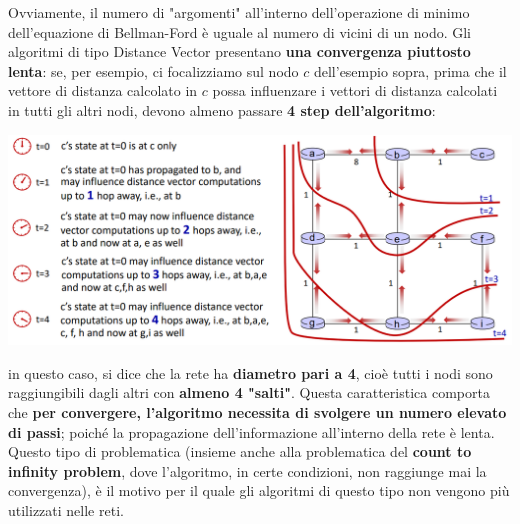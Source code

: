 \documentclass[12pt]{article}
\begin{document}
Ovviamente, il numero di "argomenti" all'interno dell'operazione di minimo dell'equazione di Bellman-Ford è uguale al numero di vicini di un nodo.
Gli algoritmi di tipo Distance Vector presentano \textbf{una convergenza piuttosto lenta}: se, per esempio, ci focalizziamo sul nodo $c$ dell'esempio sopra,
prima che il vettore di distanza calcolato in $c$ possa influenzare i vettori di distanza calcolati in tutti gli altri nodi, devono almeno passare \textbf{4 step dell'algoritmo}:
\begin{center}
    \includegraphics[width =1\linewidth]{Images/106.png}
\end{center}
in questo caso, si dice che la rete ha \textbf{diametro pari a 4}, cioè tutti i nodi sono raggiungibili dagli altri con \textbf{almeno 4 "salti"}.
Questa caratteristica comporta che \textbf{per convergere, l'algoritmo necessita di svolgere un numero elevato di passi}; poiché la propagazione dell'informazione all'interno della rete è lenta.
Questo tipo di problematica (insieme anche alla problematica del \textbf{count to infinity problem}, dove l'algoritmo, in certe condizioni, non raggiunge mai la convergenza), è il motivo per il quale
gli algoritmi di questo tipo non vengono più utilizzati nelle reti.
\end{document}
